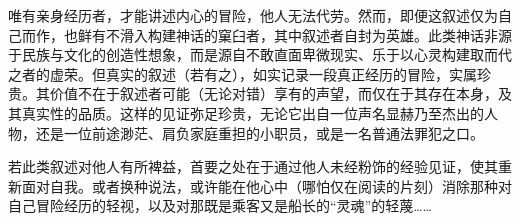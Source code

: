 唯有亲身经历者，才能讲述内心的冒险，他人无法代劳。然而，即便这叙述仅为自己而作，也鲜有不滑入构建神话的窠臼者，其中叙述者自封为英雄。此类神话非源于民族与文化的创造性想象，而是源自不敢直面卑微现实、乐于以心灵构建取而代之者的虚荣。但真实的叙述（若有之），如实记录一段真正经历的冒险，实属珍贵。其价值不在于叙述者可能（无论对错）享有的声望，而仅在于其存在本身，及其真实性的品质。这样的见证弥足珍贵，无论它出自一位声名显赫乃至杰出的人物，还是一位前途渺茫、肩负家庭重担的小职员，或是一名普通法罪犯之口。

若此类叙述对他人有所裨益，首要之处在于通过他人未经粉饰的经验见证，使其重新面对自我。或者换种说法，或许能在他心中（哪怕仅在阅读的片刻）消除那种对自己冒险经历的轻视，以及对那既是乘客又是船长的“灵魂”的轻蔑……